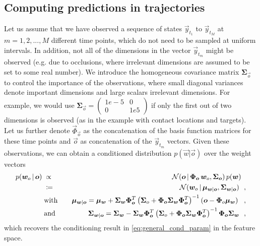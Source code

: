 \subsection{Computing predictions in trajectories}
Let us assume that we have observed a sequence of states $\vec y_{t_1}$ to $\vec y_{t_M}$ at $m=1,2, ..., M$ different time points, 
which do not need to be sampled at uniform intervals. In addition, not all of the dimensions in the vector 
$\vec y_{t_m}$ might be observed (e.g. due to occlusions, where irrelevant dimensions are assumed to be set to some real number). 
We introduce the homogeneous covariance matrix $\boldsymbol{\Sigma}_{\vec o}$ to control the importance of the observations, 
where small diagonal variances denote important dimensions and large scalars irrelevant dimensions. 
For example, we would use $\boldsymbol{\Sigma}_{\vec o} = \left( \begin{smallmatrix} 1e-5&0\\ 0&1e5 \end{smallmatrix} \right)$ 
if only the first out of two dimensions is observed (as in the example with contact locations and targets). 
Let us further denote $\vec \Phi_{\vec o}$ as the concatenation of the basis function matrices for these time points 
and $\vec o$ as concatenation of the $\vec y_{t_m}$ vectors. 
Given these observations, we can obtain a conditioned distribution $p(\vec w| \vec o)$ over the weight vectors 
\begin{eqnarray*}
    p(\boldsymbol{w}_o \, | \, \boldsymbol{o}) \;& \propto &\; \mathcal{N}(\boldsymbol{o} \, | \, \boldsymbol{\Phi}_{\boldsymbol{o}} \, \boldsymbol{w}_o, \boldsymbol{\Sigma}_{\boldsymbol{o}}) \, p(\boldsymbol{w}) ~~ \\
     \;& \coloneqq &\; \mathcal{N}(\boldsymbol{w}_o \, | \, \boldsymbol{\mu}_{\boldsymbol{w}| \boldsymbol{o}}, \boldsymbol{\Sigma}_{\boldsymbol{w}|\boldsymbol{o}}) ~~, \\
    & \text{with} & ~~~ \boldsymbol{\mu}_{\boldsymbol{w}| \boldsymbol{o}}  =  \boldsymbol{\mu}_{\boldsymbol{w}} + 
      \boldsymbol{\Sigma}_{\boldsymbol{w}}\boldsymbol{\Phi}_{\boldsymbol{o}}^T\left(\boldsymbol{\Sigma}_o + 
      \boldsymbol{\Phi}_{\boldsymbol{o}}\boldsymbol{\Sigma}_{\boldsymbol{w}}\boldsymbol{\Phi}_{\boldsymbol{o}}^T\right)^{-1}\left(\boldsymbol{o} -\boldsymbol{\Phi}_{o}\boldsymbol{\mu}_{\boldsymbol{w}}\right) ~~,  \\
    & \text{and} & ~~~ \boldsymbol{\Sigma}_{\boldsymbol{w}|\boldsymbol{o}} =  \boldsymbol{\Sigma}_{\boldsymbol{w}}-
      \boldsymbol{\Sigma}_{\boldsymbol{w}}\boldsymbol{\Phi}_{\boldsymbol{o}}^T\left(\boldsymbol{\Sigma}_o 
      +\boldsymbol{\Phi}_{\boldsymbol{o}}\boldsymbol{\Sigma}_{\boldsymbol{w}}\boldsymbol{\Phi}_{\boldsymbol{o}}^T\right)^{-1}\boldsymbol{\Phi}_{\boldsymbol{o}} \boldsymbol{\Sigma}_{\boldsymbol{w}} ~~, 
\end{eqnarray*}
which recovers the conditioning result in \eqref{eq:general_cond_param} in the feature space. 

